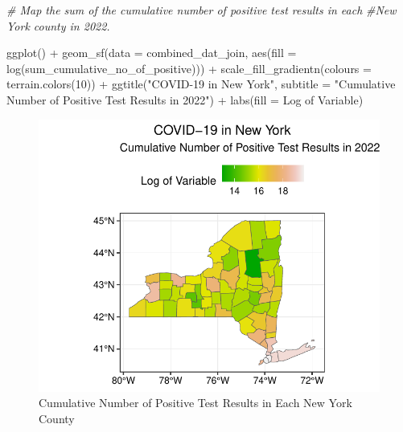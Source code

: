 \documentclass[
  12pt,
]{article}
\newenvironment{Shaded}{\begin{snugshade}}{\end{snugshade}}
\newcommand{\AttributeTok}[1]{\textcolor[rgb]{0.77,0.63,0.00}{#1}}
\newcommand{\CommentTok}[1]{\textcolor[rgb]{0.56,0.35,0.01}{\textit{#1}}}
\newcommand{\DecValTok}[1]{\textcolor[rgb]{0.00,0.00,0.81}{#1}}
\newcommand{\FunctionTok}[1]{\textcolor[rgb]{0.00,0.00,0.00}{#1}}
\newcommand{\NormalTok}[1]{#1}
\newcommand{\SpecialCharTok}[1]{\textcolor[rgb]{0.00,0.00,0.00}{#1}}
\newcommand{\StringTok}[1]{\textcolor[rgb]{0.31,0.60,0.02}{#1}}
\begin{document}
\begin{Shaded}
\begin{Highlighting}[]
\CommentTok{\# Map the sum of the cumulative number of positive test results in each}
\CommentTok{\#New York county in 2022.}

\FunctionTok{ggplot}\NormalTok{() }\SpecialCharTok{+}
  \FunctionTok{geom\_sf}\NormalTok{(}\AttributeTok{data =}\NormalTok{ combined\_dat\_join,}
          \FunctionTok{aes}\NormalTok{(}\AttributeTok{fill =} \FunctionTok{log}\NormalTok{(sum\_cumulative\_no\_of\_positive))) }\SpecialCharTok{+}
  \FunctionTok{scale\_fill\_gradientn}\NormalTok{(}\AttributeTok{colours =} \FunctionTok{terrain.colors}\NormalTok{(}\DecValTok{10}\NormalTok{)) }\SpecialCharTok{+}
  \FunctionTok{ggtitle}\NormalTok{(}\StringTok{"COVID{-}19 in New York"}\NormalTok{,}
          \AttributeTok{subtitle =} \StringTok{"Cumulative Number of Positive Test Results in 2022"}\NormalTok{) }\SpecialCharTok{+}
  \FunctionTok{labs}\NormalTok{(}\AttributeTok{fill =} \StringTok{\textquotesingle{}Log of Variable\textquotesingle{}}\NormalTok{)}
\end{Highlighting}
\end{Shaded}

\begin{figure}

{\centering \includegraphics{EDA_Final_Group_Project_files/figure-latex/unnamed-chunk-18-1} 

}

\caption{Cumulative Number of Positive Test Results in Each New York County}\label{fig:unnamed-chunk-18}
\end{figure}
\end{document}
